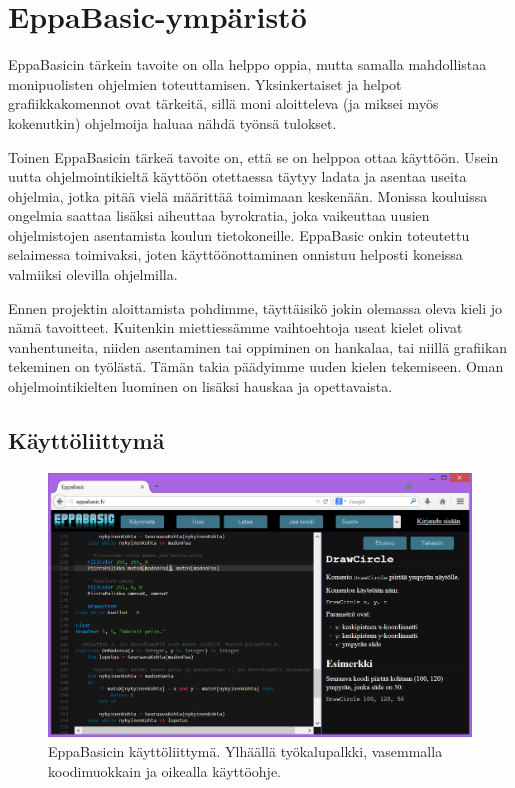 \section{EppaBasic-ympäristö}
EppaBasicin tärkein tavoite on olla
helppo oppia,
mutta samalla mahdollistaa
monipuolisten ohjelmien toteuttamisen.
Yksinkertaiset ja helpot grafiikkakomennot ovat tärkeitä,
sillä moni aloitteleva (ja miksei myös kokenutkin)
ohjelmoija haluaa nähdä työnsä tulokset.

Toinen EppaBasicin tärkeä tavoite on,
että se on helppoa ottaa käyttöön.
Usein uutta ohjelmointikieltä käyttöön otettaessa
täytyy ladata ja asentaa useita ohjelmia,
jotka pitää vielä määrittää
toimimaan keskenään.
Monissa kouluissa
ongelmia saattaa lisäksi aiheuttaa byrokratia,
joka vaikeuttaa uusien ohjelmistojen asentamista
koulun tietokoneille.
EppaBasic onkin toteutettu
selaimessa toimivaksi, joten
käyttöönottaminen onnistuu
helposti koneissa valmiiksi
olevilla ohjelmilla.

Ennen projektin aloittamista pohdimme,
täyttäisikö jokin olemassa oleva
kieli jo nämä tavoitteet.
Kuitenkin miettiessämme vaihtoehtoja
useat kielet olivat vanhentuneita,
niiden asentaminen tai oppiminen on hankalaa,
tai niillä grafiikan tekeminen on työlästä.
Tämän takia päädyimme uuden kielen tekemiseen.
Oman ohjelmointikielten luominen on lisäksi hauskaa
ja opettavaista.

\subsection{Käyttöliittymä}
\begin{figure}[h]
    \centering
    \includegraphics[width=1\textwidth]{kayttoliittyma}
    \caption{EppaBasicin käyttöliittymä. Ylhäällä työkalupalkki, vasemmalla koodimuokkain ja oikealla käyttöohje.}
    \label{img:kayttoliittyma}
\end{figure}

